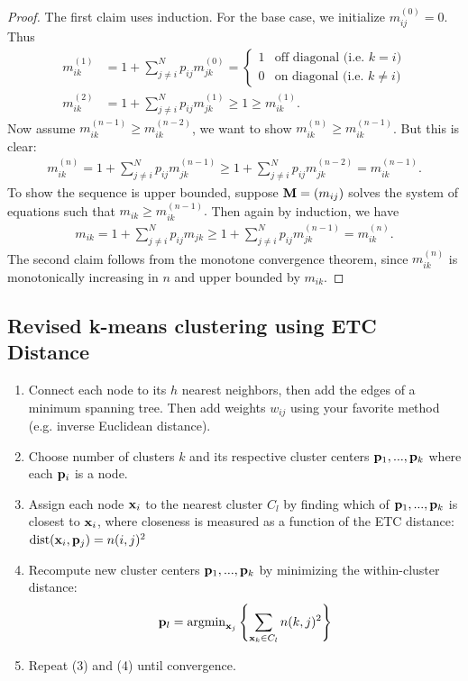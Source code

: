 \documentclass[./some_latex_template.tex]{subfiles}
\begin{document}
\begin{proof}
The first claim uses induction. For the base case, we initialize $m_{ij}^{(0)} = 0$. Thus
\begin{align*}
	m_{ik}^{(1)} 
	&= 1 + \sum_{j\neq i}^{N} p_{ij}m_{jk}^{(0)} = 
	\begin{cases}
		1 & \text{off diagonal (i.e. } k = i)\\
		0 & \text{on diagonal (i.e. } k \neq i)
	\end{cases}\\
	m_{ik}^{(2)} 
	&= 1 + \sum_{j\neq i}^{N} p_{ij} m_{jk}^{(1)} \ge 1 \ge m_{ik}^{(1)}.
\end{align*} 
Now assume $m_{ik}^{(n-1)} \ge m_{ik}^{(n-2)}$, we want to show $m_{ik}^{(n)} \ge m_{ik}^{(n-1)}$. But this is clear: 
\begin{align*}
	m_{ik}^{(n)} = 1 + \sum_{j\neq i}^{N} p_{ij} m_{jk}^{(n - 1)} \geq  1 + \sum_{j\neq i}^{N} p_{ij} m_{jk}^{(n-2)} = 	m_{ik}^{(n - 1)}.
\end{align*}
To show the sequence is upper bounded, suppose $\mathbf{M} = (m_{ij})$ solves the system of equations such that $m_{ik} \ge m_{ik}^{(n - 1)}.$ Then again by induction, we have
\begin{align*}
	m_{ik} = 1 + \sum_{j \neq i}^{N}p_{ij}m_{jk} \ge 1 + \sum_{j\neq i}^N p_{ij} m_{jk}^{(n-1)} = m_{ik}^{(n)}.
\end{align*}
The second claim follows from the monotone convergence theorem, since $m_{ik}^{(n)}$ is monotonically increasing in $n$ and upper bounded by $m_{ik}$. 
\end{proof}

\subsection{Revised k-means clustering using ETC Distance}

\begin{enumerate}
	\item Connect each node to its $h$ nearest neighbors, then add the edges of a minimum spanning tree. Then add weights $w_{ij}$ using your favorite method (e.g. inverse Euclidean distance). 
	\item Choose number of clusters $k$ and its respective cluster centers $\mathbf{p}_1,...,\mathbf{p}_k$ where each $\mathbf{p}_i$ is a node.
	\item Assign each node $\mathbf{x}_i$ to the nearest cluster $C_l$ by finding which of $\mathbf{p}_1,...,\mathbf{p}_k$ is closest to $\mathbf{x}_i$, where closeness is measured as a function of the ETC distance: $\mathop{\rm dist}\nolimits(\mathbf{x}_i, \mathbf{p}_j) = n(i, j)^2$ 
	\item Recompute new cluster centers $\mathbf{p}_1,...,\mathbf{p}_k$ by minimizing the within-cluster distance:
	\begin{align*}
		\mathbf{p}_l = \mathop{\rm argmin}\nolimits_{\mathbf{x}_j} \left\{ \sum_{\mathbf{x}_k \in C_l}n(k, j)^2 \right\}
	\end{align*}
	\item Repeat (3) and (4) until convergence. 
\end{enumerate}
\end{document}
